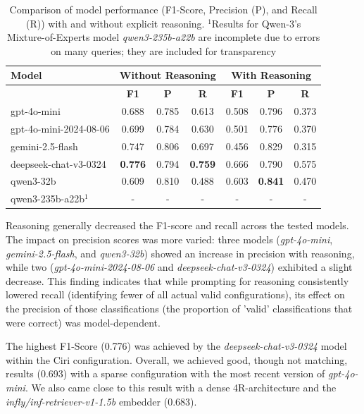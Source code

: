 
\begin{table}[h]
    \centering
    \begin{tabular}{|l|c|c|c|c|c|c|}
        \hline
        \textbf{Model} & \multicolumn{3}{c|}{\textbf{Without Reasoning}} & \multicolumn{3}{c|}{\textbf{With Reasoning}} \\
        \hline
        & \textbf{F1} & \textbf{P} & \textbf{R} & \textbf{F1} &  \textbf{P} & \textbf{R} \\
        \hline
        gpt-4o-mini             & 0.688 & 0.785 & 0.613 & 0.508 & 0.796 & 0.373 \\
        gpt-4o-mini-2024-08-06  & 0.699 & 0.784 & 0.630 & 0.501 & 0.776 & 0.370\\
        gemini-2.5-flash        & 0.747 & 0.806 & 0.697 & 0.456 & 0.829 & 0.315 \\
        deepseek-chat-v3-0324   & \textbf{0.776} & 0.794 & \textbf{0.759} & 0.666 & 0.790 & 0.575 \\
        qwen3-32b & 0.609 & 0.810 & 0.488 & 0.603 & \textbf{0.841} & 0.470 \\
        qwen3-235b-a22b$^1$ & - & - & - & - & - & - \\
        \hline
    \end{tabular}
    \caption{Comparison of model performance (F1-Score, Precision (P), and Recall (R)) with and without explicit reasoning. $^1$Results for Qwen-3's Mixture-of-Experts model \textit{qwen3-235b-a22b} are incomplete due to errors on many queries; they are included for transparency}
    \label{tab:model_comparison}
\end{table}

Reasoning generally decreased the F1-score and recall across the tested models. The impact on precision scores was more varied: three models (\textit{gpt-4o-mini}, \textit{gemini-2.5-flash}, and \textit{qwen3-32b}) showed an increase in precision with reasoning, while two (\textit{gpt-4o-mini-2024-08-06} and \textit{deepseek-chat-v3-0324}) exhibited a slight decrease. This finding indicates that while prompting for reasoning consistently lowered recall (identifying fewer of all actual valid configurations), its effect on the precision of those classifications (the proportion of 'valid' classifications that were correct) was model-dependent.

The highest F1-Score (0.776) was achieved by the \textit{deepseek-chat-v3-0324} model within the Ciri configuration. Overall, we achieved good, though not matching, results (0.693) with a sparse configuration with the most recent version of \textit{gpt-4o-mini}. We also came close to this result with a dense 4R-architecture and the \textit{infly/inf-retriever-v1-1.5b} embedder (0.683). 



